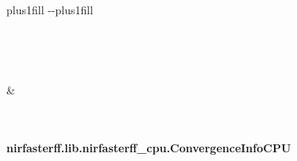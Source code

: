 \documentclass[letterpaper,10pt,english]{sphinxmanual}
\begin{document}
\begin{savenotes}
\sphinxatlongtablestart
\sphinxthistablewithglobalstyle
\sphinxthistablewithnovlinesstyle
\makeatletter
  \LTleft \@totalleftmargin plus1fill
  \LTright\dimexpr\columnwidth-\@totalleftmargin-\linewidth\relax plus1fill
\makeatother
\begin{longtable}{}
\sphinxtoprule
\endfirsthead

\\
\sphinxtoprule
\endhead

\sphinxbottomrule
{}\\
\endfoot

\endlastfoot
\sphinxtableatstartofbodyhook
\begin{varwidth}[t]{}
\sphinxAtStartPar
{\hyperref[\detokenize{_autosummary/nirfasterff.lib.nirfasterff_cpu.ConvergenceInfoCPU:nirfasterff.lib.nirfasterff_cpu.ConvergenceInfoCPU}]{}}
\sphinxbeforeendvarwidth
\end{varwidth}%
&\begin{varwidth}[t]{}
\sphinxAtStartPar

\sphinxbeforeendvarwidth
\end{varwidth}%
\\
\sphinxbottomrule
\end{longtable}
\sphinxtableafterendhook
\sphinxatlongtableend
\end{savenotes}

\sphinxstepscope


\paragraph{nirfasterff.lib.nirfasterff\_cpu.ConvergenceInfoCPU}
\label{\detokenize{_autosummary/nirfasterff.lib.nirfasterff_cpu.ConvergenceInfoCPU:nirfasterff-lib-nirfasterff-cpu-convergenceinfocpu}}\label{\detokenize{_autosummary/nirfasterff.lib.nirfasterff_cpu.ConvergenceInfoCPU::doc}}
\end{document}
